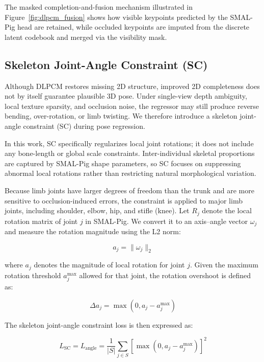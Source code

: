 \documentclass[computers,article,submit,pdftex,moreauthors]{Definitions/mdpi}
\begin{document}
The masked completion-and-fusion mechanism illustrated in Figure~\ref{fig:dlpcm_fusion} shows how visible keypoints predicted by the SMAL-Pig head are retained, while occluded keypoints are imputed from the discrete latent codebook and merged via the visibility mask.

\subsection{Skeleton Joint-Angle Constraint (SC)}\label{sec:sc}

Although DLPCM restores missing 2D structure, improved 2D completeness does not by itself guarantee plausible 3D pose. Under single-view depth ambiguity, local texture sparsity, and occlusion noise, the regressor may still produce reverse bending, over-rotation, or limb twisting. We therefore introduce a skeleton joint-angle constraint (SC) during pose regression.

In this work, SC specifically regularizes local joint rotations; it does not include any bone-length or global scale constraints. Inter-individual skeletal proportions are captured by SMAL-Pig shape parameters, so SC focuses on suppressing abnormal local rotations rather than restricting natural morphological variation.

Because limb joints have larger degrees of freedom than the trunk and are more sensitive to occlusion-induced errors, the constraint is applied to major limb joints, including shoulder, elbow, hip, and stifle (knee). Let $R_j$ denote the local rotation matrix of joint $j$ in SMAL-Pig. We convert it to an axis--angle vector $\omega_j$ and measure the rotation magnitude using the L2 norm:

\begin{equation}
a_j = \|\omega_j\|_2
\end{equation}

where $a_j$ denotes the magnitude of local rotation for joint $j$. Given the maximum rotation threshold $a_j^{\max}$ allowed for that joint, the rotation overshoot is defined as:

\begin{equation}
\Delta a_j = \max(0, a_j - a_j^{\max})
\end{equation}

The skeleton joint-angle constraint loss is then expressed as:

\begin{equation}
L_{\text{SC}} = L_{\text{angle}} = \frac{1}{|S|} \sum_{j \in S} [\max(0, a_j - a_j^{\max})]^2
\end{equation}
\end{document}
